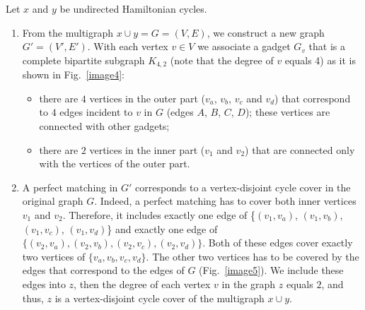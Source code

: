 \documentclass[runningheads]{llncs}
\begin{document}
Let $x$ and $y$ be undirected Hamiltonian cycles. %
\begin{enumerate}
    \item [Step 1.] From the multigraph $x \cup y = G = (V, E)$, we construct a new graph $G' = (V', E')$. With each vertex $v \in V$ we associate a gadget $G_v$ that is a complete bipartite subgraph $K_{4,2}$ (note that the degree of $v$ equals 4) as it is shown in Fig.~\ref{image4}:
	\begin{itemize}
	    \item there are $4$ vertices in the outer part ($v_a$, $v_b$, $v_c$ and $v_d$) that correspond to $4$ edges incident to $v$ in $G$ (edges $A$, $B$, $C$, $D$); these vertices are connected with other gadgets; %
		\item there are $2$ vertices in the inner part ($v_1$ and $v_2$) that are connected only with the vertices of the outer part. %
	\end{itemize}
	\item [Step 2.] A perfect matching in $G'$ corresponds to a vertex-disjoint cycle cover in the original graph $G$.
	Indeed, a perfect matching has to cover both inner vertices $v_1$ and $v_2$. 
	Therefore, it includes exactly one edge of \{$(v_1,v_a)$, $(v_1,v_b)$, $(v_1,v_c)$, $(v_1,v_d)$\} and exactly one edge of $\{(v_2,v_a), (v_2,v_b), (v_2,v_c), (v_2,v_d)\}$.
	Both of these edges cover exactly two vertices of $\{v_a,v_b,v_c,v_d\}$.
	The other two vertices has to be covered by the edges that correspond to the edges of $G$ (Fig.~\ref{image5}). 
	We include these edges into $z$, then the degree of each vertex $v$ in the graph $z$ equals $2$, and thus, $z$ is a vertex-disjoint cycle cover of the multigraph $x \cup y$.
\end{enumerate}
\end{document}
